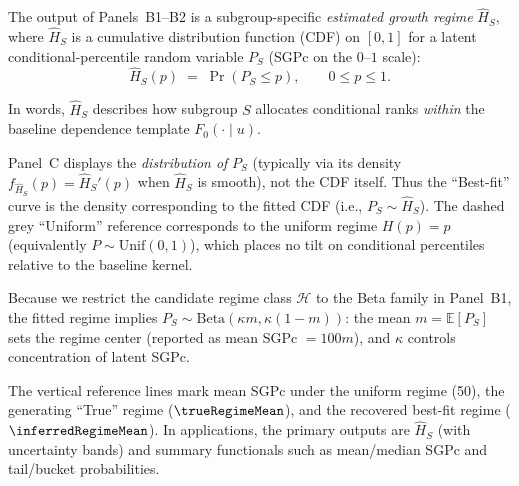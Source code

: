 \documentclass[10pt]{article}
\begin{document}
\noindent
\begin{minipage}[t]{3.75in}
  \vspace{0.05in}
  \hspace{0.15in}%
  \begin{minipage}{3.45in}
    \small\raggedright\color{bodyGrey}

    The output of Panels~B1--B2 is a subgroup-specific \emph{estimated growth regime}
    $\widehat{H}_S$, where $\widehat{H}_S$ is a cumulative distribution function (CDF) on $[0,1]$
    for a latent conditional-percentile random variable $P_S$ (SGPc on the $0$--$1$ scale):
    \[
      \widehat{H}_S(p)\;=\;\Pr(P_S \le p),\qquad 0\le p\le 1.
    \]
    
    \vspace{1pt}
    In words, $\widehat{H}_S$ describes how subgroup $S$ allocates conditional ranks
    \emph{within} the baseline dependence template $F_0(\cdot\mid u)$.
    
    \vspace{4pt}
    Panel~C displays the \emph{distribution of} $P_S$ (typically via its density
    $f_{\widehat{H}_S}(p)=\widehat{H}_S'(p)$ when $\widehat{H}_S$ is smooth), not the CDF itself.
    Thus the ``Best-fit'' curve is the density corresponding to the fitted CDF
    (i.e., $P_S \sim \widehat{H}_S$). The dashed grey ``Uniform'' reference corresponds to the
    uniform regime $H(p)=p$ (equivalently $P\sim\mathrm{Unif}(0,1)$), which places no tilt on
    conditional percentiles relative to the baseline kernel.
    
    \vspace{4pt}
    Because we restrict the candidate regime class $\mathcal{H}$ to the Beta family in Panel~B1,
    the fitted regime implies
    $P_S\sim\mathrm{Beta}(\kappa m,\kappa(1-m))$:
    the mean $m=\mathbb{E}[P_S]$ sets the regime center (reported as mean SGPc $=100m$),
    and $\kappa$ controls concentration of latent SGPc.
    
    \vspace{4pt}
    The vertical reference lines mark mean SGPc under the uniform regime (50),
    the generating ``True'' regime ($\trueRegimeMean$), and the recovered best-fit regime
    ($\inferredRegimeMean$). In applications, the primary outputs are $\widehat{H}_S$
    (with uncertainty bands) and summary functionals such as mean/median SGPc and
    tail/bucket probabilities.

  \end{minipage}
  \vspace{0.1in}
\end{minipage}
\end{document}
